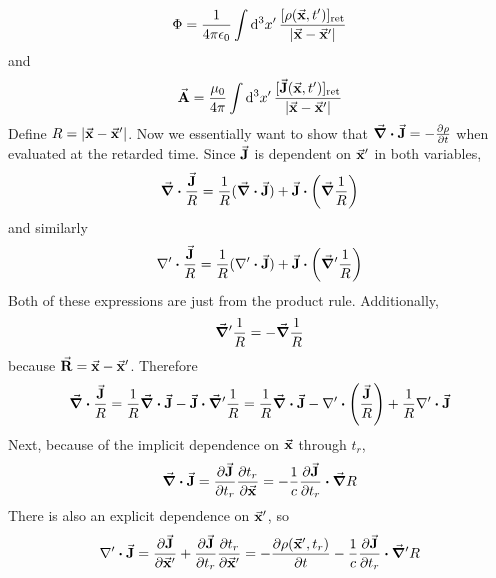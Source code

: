 \documentclass[a4paper,twoside]{article}
\begin{document}
\begin{itemize}
\begin{problem}
\begin{equation}
                \Phi = \frac{1}{4 \pi \epsilon_0} \int \dd[3]{x'} \frac{[\rho( \va{x},t')]_{\text{ret}}}{\abs{ \va{x} - \va{x}'}}
            \end{equation}
            and
            \begin{equation}
                \va{A} = \frac{\mu_0}{4 \pi} \int \dd[3]{x'} \frac{[ \va{J}( \va{x},t')]_{\text{ret}}}{\abs{ \va{x} - \va{x}'}}
            \end{equation}
            Define $ R = \abs{ \va{x} - \va{x}'} $. Now we essentially want to show that $ \div{ \va{J}} = - \pdv{\rho}{t} $ when evaluated at the retarded time. Since $ \va{J} $ is dependent on $ \va{x}' $ in both variables,
            \begin{equation}
                \div{ \frac{ \va{J}}{R}} = \frac{1}{R} (\div{ \va{J}}) + \va{J} \vdot \left( \grad{\frac{1}{R}} \right)
            \end{equation}
            and similarly
            \begin{equation}
                \nabla' \vdot \frac{ \va{J}}{R} = \frac{1}{R} (\nabla' \vdot \va{J}) + \va{J} \vdot \left( \grad'{\frac{1}{R}} \right)
            \end{equation}
            Both of these expressions are just from the product rule. Additionally,
            \begin{equation}
                \grad'{\frac{1}{R}} = - \grad{\frac{1}{R}} 
            \end{equation}
            because $ \va{R} = \va{x} - \va{x}' $. Therefore
            \begin{equation}
                \div{ \frac{\va{J}}{R}} = \frac{1}{R} \div{ \va{J}} - \va{J} \vdot \grad'{\frac{1}{R}} = \frac{1}{R} \div{ \va{J}} - \nabla' \vdot \left( \frac{ \va{J}}{R} \right) + \frac{1}{R} \nabla' \vdot \va{J}
            \end{equation}
            Next, because of the implicit dependence on $ \va{x} $ through $ t_r $,
            \begin{equation}
                \div{ \va{J}} = \pdv{ \va{J}}{t_r} \pdv{t_r}{ \va{x}} = - \frac{1}{c} \pdv{ \va{J}}{t_r} \vdot \grad{R}
            \end{equation}
            There is also an explicit dependence on $ \va{x}' $, so
            \begin{equation}
                \nabla' \vdot \va{J} = \pdv{ \va{J}}{ \va{x}'} + \pdv{ \va{J}}{t_r} \pdv{t_r}{ \va{x}'} = - \pdv{\rho( \va{x}', t_r)}{t} - \frac{1}{c} \pdv{ \va{J}}{t_r} \vdot \grad'{R}

\end{equation}
\end{problem}
\end{itemize}
\end{document}
